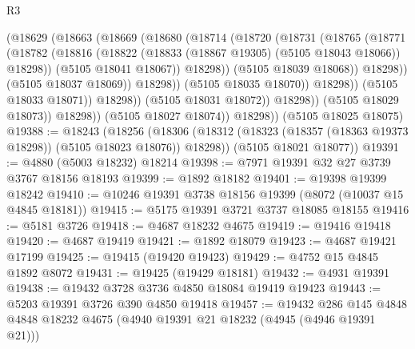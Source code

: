 \begin{lexlean}{R3}
\begin{coremodule}
                                (@18629
                                  (@18663
                                    (@18669
                                      (@18680
                                        (@18714
                                          (@18720
                                            (@18731
                                              (@18765
                                                (@18771
                                                  (@18782
                                                    (@18816
                                                      (@18822
                                                        (@18833
                                                          (@18867 @19305)
                                                          (@5105 @18043 @18066))
                                                        @18298))
                                                    (@5105 @18041 @18067))
                                                  @18298))
                                              (@5105 @18039 @18068))
                                            @18298))
                                        (@5105 @18037 @18069))
                                      @18298))
                                  (@5105 @18035 @18070))
                                @18298))
                            (@5105 @18033 @18071))
                          @18298))
                      (@5105 @18031 @18072))
                    @18298))
                (@5105 @18029 @18073))
              @18298))
          (@5105 @18027 @18074))
        @18298))
    (@5105 @18025 @18075)
@19388 := @18243
    (@18256
      (@18306 (@18312 (@18323 (@18357 (@18363 @19373 @18298)) (@5105 @18023 @18076)) @18298))
      (@5105 @18021 @18077))
@19391 := @4880 (@5003 @18232) @18214
@19398 := @7971 @19391 @32 @27 @3739 @3767 @18156 @18193
@19399 := @1892 @18182
@19401 := @19398 @19399 @18242
@19410 := @10246 @19391 @3738 @18156 @19399 (@8072 (@10037 @15 @4845 @18181))
@19415 := @5175 @19391 @3721 @3737 @18085 @18155
@19416 := @5181 @3726
@19418 := @4687 @18232 @4675
@19419 := @19416 @19418
@19420 := @4687 @19419
@19421 := @1892 @18079
@19423 := @4687 @19421 @17199
@19425 := @19415 (@19420 @19423)
@19429 := @4752 @15 @4845 @1892 @8072
@19431 := @19425 (@19429 @18181)
@19432 := @4931 @19391
@19438 := @19432 @3728 @3736 @4850 @18084 @19419 @19423
@19443 := @5203 @19391 @3726 @390 @4850 @19418
@19457 := @19432
    @286
    @145
    @4848
    @4848
    @18232
    @4675
    (@4940 @19391 @21 @18232 (@4945 (@4946 @19391 @21)))

\end{coremodule}
\end{lexlean}

